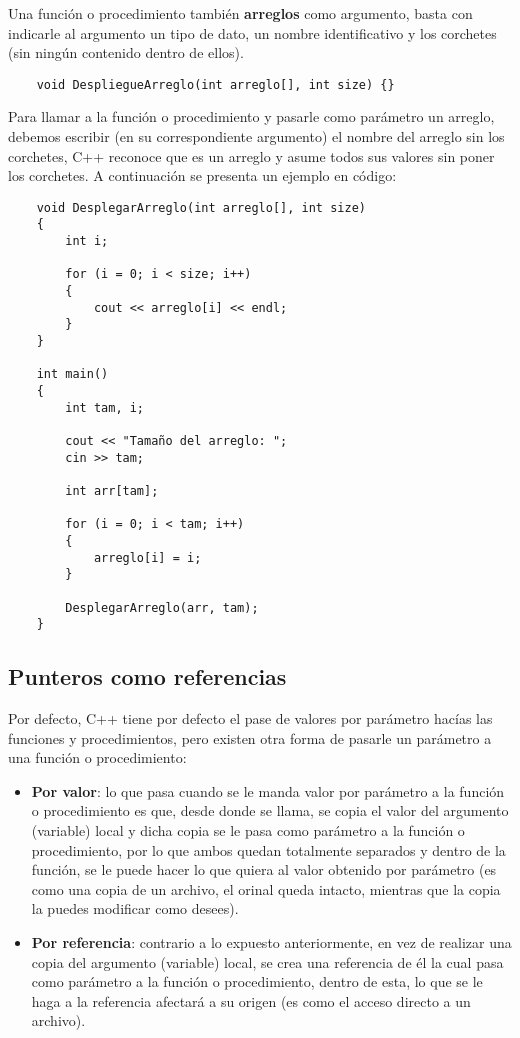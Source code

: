 Una función o procedimiento también \textbf{arreglos} como argumento, basta con indicarle al argumento un tipo de dato, un nombre identificativo y los corchetes (sin ningún contenido dentro de ellos).
\begin{lstlisting}
    void DespliegueArreglo(int arreglo[], int size) {}
\end{lstlisting}

Para llamar a la función o procedimiento y pasarle como parámetro un arreglo, debemos escribir (en su correspondiente argumento) el nombre del arreglo sin los corchetes, C++ reconoce que es un arreglo y asume todos sus valores sin poner los corchetes. A continuación se presenta un ejemplo en código:
\begin{lstlisting}
    void DesplegarArreglo(int arreglo[], int size)
    {
        int i;
        
        for (i = 0; i < size; i++)
        {
            cout << arreglo[i] << endl;
        }
    }
    
    int main()
    {
        int tam, i;
        
        cout << "Tamaño del arreglo: ";
        cin >> tam;
        
        int arr[tam];
        
        for (i = 0; i < tam; i++)
        {
            arreglo[i] = i;
        }
        
        DesplegarArreglo(arr, tam);
    }
\end{lstlisting}


\subsection{Punteros como referencias}

Por defecto, C++ tiene por defecto el pase de valores por parámetro hacías las funciones y procedimientos, pero existen otra forma de pasarle un parámetro a una función o procedimiento:
\begin{itemize}
    \item \textbf{Por valor}: lo que pasa cuando se le manda valor por parámetro a la función o procedimiento es que, desde donde se llama, se copia el valor del argumento (variable) local y dicha copia se le pasa como parámetro a la función o procedimiento, por lo que ambos quedan totalmente separados y dentro de la función, se le puede hacer lo que quiera al valor obtenido por parámetro (es como una copia de un archivo, el orinal queda intacto, mientras que la copia la puedes modificar como desees).
    \item \textbf{Por referencia}: contrario a lo expuesto anteriormente, en vez de realizar una copia del argumento (variable) local, se crea una referencia de él la cual pasa como parámetro a la función o procedimiento, dentro de esta, lo que se le haga a la referencia afectará a su origen (es como el acceso directo a un archivo).
\end{itemize}

